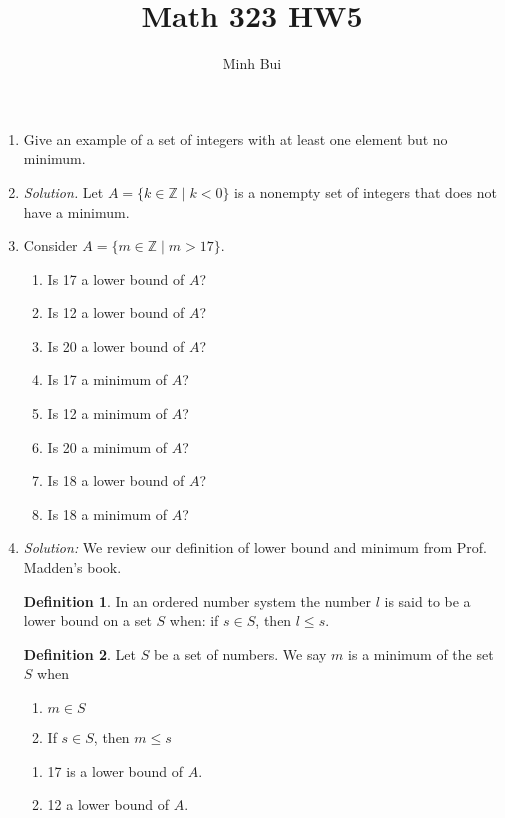 \documentclass{article}
\author{Minh Bui}
\title{Math 323 HW5}
\theoremstyle{claim}
\theoremstyle{definition}
\newtheorem{definition}{Definition}
\begin{document}
\maketitle
\begin{enumerate}
    \item[Problem 3.2:] Give an example of a set of integers with at least one element but no minimum.
    \item[] \emph{Solution.} Let $A = \{k \in \mathbb{Z} \mid k < 0\}$ is a nonempty set of integers that does not have a minimum.
    \item[Problem 3.4:] Consider $A = \{m \in \mathbb{Z} \mid m > 17\}$.
        \begin{enumerate}
            \item Is 17 a lower bound of $A$?
            \item Is 12 a lower bound of $A$?
            \item Is 20 a lower bound of $A$?
            \item Is 17 a minimum of $A$?
            \item Is 12 a minimum of $A$?
            \item Is 20 a minimum of $A$?
            \item Is 18 a lower bound of $A$?
            \item Is 18 a minimum of $A$?
        \end{enumerate}
    \item[] \emph{Solution:} We review our definition of lower bound and minimum from Prof. Madden's book.
        \begin{definition}
            In an ordered number system the number $l$ is said to be a lower bound on a set $S$ when: if $s \in S$, then $l \le s$.
        \end{definition}
        \begin{definition}
            Let $S$ be a set of numbers. We say $m$ is a minimum of the set $S$ when
            \begin{enumerate}
                \item[1.] $m \in S$
                \item[2.] If $s \in S$, then $m \le s$
            \end{enumerate}
        \end{definition}
        \begin{enumerate}
            \item 17 is a lower bound of $A$. 
            \item 12 a lower bound of $A$.

\end{enumerate}
\end{enumerate}
\end{document}
